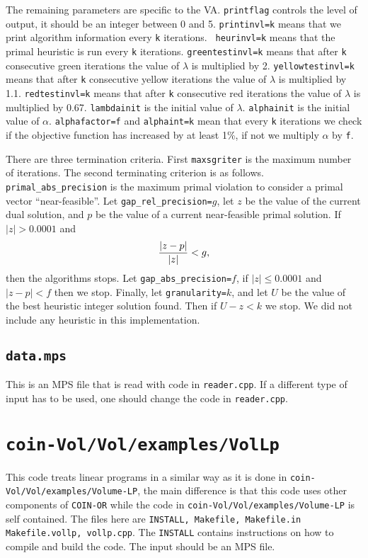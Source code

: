 \documentclass{article}
\begin{document}
The remaining parameters are specific to the VA. {\tt printflag} controls the
level of output, it should be an integer between 0 and 5. {\tt printinvl=k}
means that we print algorithm information every {\tt k} iterations. {\tt
heurinvl=k} means that the primal heuristic is run every {\tt k} iterations.
{\tt greentestinvl=k} means that after {\tt k} consecutive green iterations
the value of $\lambda$ is multiplied by 2. {\tt yellowtestinvl=k} means that
after {\tt k} consecutive yellow iterations the value of $\lambda$ is
multiplied by 1.1. {\tt redtestinvl=k} means that after {\tt k} consecutive
red iterations the value of $\lambda$ is multiplied by 0.67. {\tt lambdainit}
is the initial value of $\lambda$. {\tt alphainit} is the initial value of
$\alpha$. {\tt alphafactor=f} and {\tt alphaint=k} mean that every {\tt k}
iterations we check if the objective function has increased by at least 1\%,
if not we multiply $\alpha$ by {\tt f}.

There are three termination criteria. First {\tt maxsgriter} is the maximum
number of iterations. The second terminating criterion is as follows. {\tt
primal\_abs\_precision} is the maximum primal violation to consider a primal
vector ``near-feasible''. Let {\tt gap\_rel\_precision=$g$}, let $z$ be the
value of the current dual solution, and $p$ be the value of a current
near-feasible primal solution. If $|z| > 0.0001$ and
$$
        { | z - p | \over | z | } < g,
$$
then the algorithms stops. Let {\tt gap\_abs\_precision=$f$}, if $|z| \le
0.0001$ and $| z - p | < f$ then we stop. Finally, let {\tt granularity=$k$},
and let $U$ be the value of the best heuristic integer solution found. Then if
$ U - z < k$ we stop. We did not include any heuristic in this 
implementation.

\subsection{{\tt data.mps}}

This is an MPS file that is read with code in {\tt reader.cpp}.
If a different type of input has to be used, one should change
the code in {\tt reader.cpp}.

\section{{\tt coin-Vol/Vol/examples/VolLp}}

This code treats linear programs in a similar way as it is done in 
{\tt coin-Vol/Vol/examples/Volume-LP}, the main difference is that this
code uses other components of {\tt COIN-OR} while the code in \goodbreak
{\tt coin-Vol/Vol/examples/Volume-LP} is self contained. 
The files here are {\tt INSTALL, Makefile, Makefile.in %
Makefile.vollp, vollp.cpp}.
The {\tt INSTALL} contains instructions on how to compile and build
the code. The input should be an MPS file.
\end{document}
